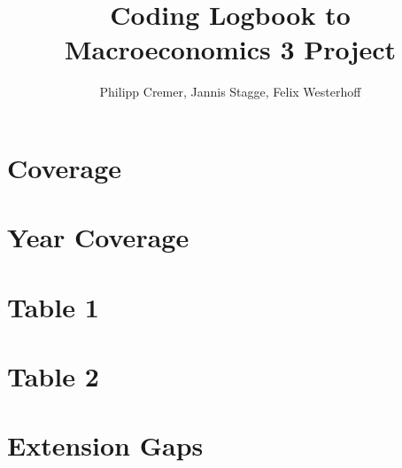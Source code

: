 \documentclass{article}
\title{Coding Logbook to Macroeconomics 3 Project}
\author{Philipp Cremer, Jannis Stagge, Felix Westerhoff}
\begin{document}
\maketitle

\section{Coverage}


\section{Year Coverage}


\section{Table 1}


\section{Table 2}


\section{Extension Gaps}



\end{document}
